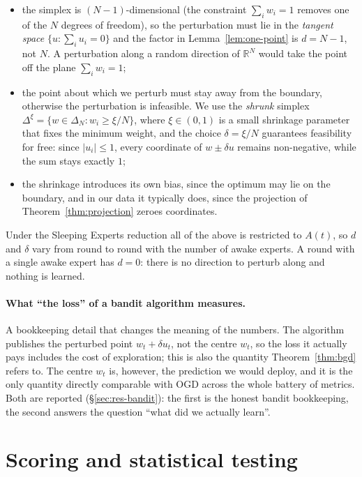 \documentclass[12pt,a4paper,oneside]{report}
\renewcommand{\_}{\oldunderscore\allowbreak}
\theoremstyle{definition}
\theoremstyle{plain}
\theoremstyle{definition}   %
\begin{document}
\begin{itemize}
  \item the simplex is $(N\!-\!1)$-dimensional (the constraint $\sum_i w_i = 1$ removes one of
        the $N$ degrees of freedom), so the perturbation must lie in the
        \emph{tangent space} $\{u : \sum_i u_i = 0\}$ and the factor in
        Lemma~\ref{lem:one-point} is $d = N-1$, not $N$. A perturbation along a random direction
        of $\mathbb{R}^N$ would take the point off the plane $\sum_i w_i = 1$;
  \item the point about which we perturb must stay away from the boundary, otherwise the
        perturbation is infeasible. We use the \emph{shrunk} simplex
        $\Delta^{\xi} = \{w \in \Delta_N : w_i \geq \xi/N\}$, where $\xi \in (0,1)$ is a small
        shrinkage parameter that fixes the minimum weight, and the choice $\delta = \xi/N$ guarantees
        feasibility for free: since $|u_i|\leq 1$, every coordinate of $w \pm \delta u$ remains
        non-negative, while the sum stays exactly $1$;
  \item the shrinkage introduces its own bias, since the optimum may lie on the boundary,
        and in our data it typically does, since the projection of
        Theorem~\ref{thm:projection} zeroes coordinates.
\end{itemize}

Under the Sleeping Experts reduction all of the above is restricted to $A(t)$, so $d$ and
$\delta$ vary from round to round with the number of awake experts. A round with a single awake
expert has $d=0$: there is no direction to perturb along and nothing is learned.

\paragraph{What ``the loss'' of a bandit algorithm measures.} A bookkeeping detail that changes
the meaning of the numbers. The algorithm publishes the perturbed point $w_t + \delta u_t$, not
the centre $w_t$, so the loss it actually pays includes the cost of exploration; this is also the
quantity Theorem~\ref{thm:bgd} refers to. The centre $w_t$ is, however, the prediction we would
deploy, and it is the only quantity directly comparable with OGD across the whole battery of
metrics. Both are reported (\S\ref{sec:res-bandit}): the first is the honest bandit bookkeeping,
the second answers the question ``what did we actually learn''.

\section{Scoring and statistical testing}
\end{document}

